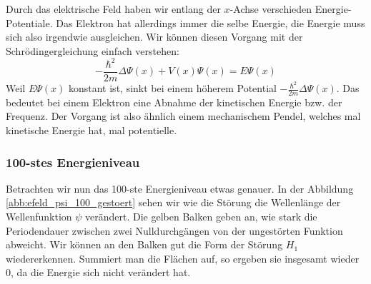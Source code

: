 \begin{refsection}
Durch das elektrische Feld haben wir entlang der $x$-Achse verschieden Energie-Potentiale.
Das Elektron hat allerdings immer die selbe Energie,
die Energie muss sich also irgendwie ausgleichen.
Wir k\"onnen diesen Vorgang mit der Schr\"odingergleichung einfach verstehen:
\[
-\frac{\hbar^2}{2m}\Delta\Psi(x) + V(x)\Psi(x)
=
E \Psi(x)
\]
Weil $E \Psi(x)$ konstant ist, sinkt bei einem h\"oherem Potential $-\frac{\hbar^2}{2m}\Delta\Psi(x)$.
Das bedeutet bei einem Elektron eine Abnahme der kinetischen Energie bzw. der Frequenz.
Der Vorgang ist also \"ahnlich einem mechanischem Pendel, 
welches mal kinetische Energie hat, mal potentielle.



\subsubsection{100-stes Energieniveau}
Betrachten wir nun das 100-ste Energieniveau etwas genauer.
In der Abbildung \ref{abb:efeld_psi_100_gestoert} sehen wir wie die St\"orung 
die Wellenl\"ange der Wellenfunktion $\psi$ ver\"andert. 
Die gelben Balken geben an, wie stark die Periodendauer zwischen zwei Nulldurchg\"angen
von der ungest\"orten Funktion abweicht.
Wir k\"onnen an den Balken gut die Form der St\"orung $H_1$ wiedererkennen.
Summiert man die Fl\"achen auf, so ergeben sie insgesamt wieder $0$, da die Energie sich nicht ver\"andert hat.



\end{refsection}
